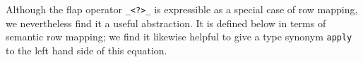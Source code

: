 \documentclass[authoryear, acmsmall, screen, review, nonacm]{acmart}
\begin{document}
Although the flap operator \verb!_<?>_! is expressible as a special case of row mapping, we nevertheless find it a useful abstraction. It is defined below in terms of semantic row mapping; we find it likewise helpful to give a type synonym \verb!apply! to the left hand side of this equation.

\begin{code}%
\>[0]\AgdaSpace{}%
\AgdaSymbol{:}\AgdaSpace{}%
\AgdaSpace{}%
\AgdaSpace{}%
\AgdaSpace{}%
\AgdaSpace{}%
\AgdaSpace{}%
\AgdaSpace{}%
\AgdaSymbol{((}\AgdaSpace{}%
\AgdaSpace{}%
\AgdaSymbol{)}\AgdaSpace{}%
\AgdaSpace{}%
\AgdaSymbol{)}\<%
\\
\>[0]\AgdaSpace{}%
\AgdaSpace{}%
\AgdaSymbol{=}\AgdaSpace{}%
\AgdaSpace{}%
\AgdaSpace{}%
\AgdaSpace{}%
\AgdaSpace{}%
\AgdaSpace{}%
\AgdaSpace{}%
\AgdaSymbol{(}\AgdaSpace{}%
\AgdaSpace{}%
\AgdaSymbol{)}\<%
\\
%
\\[\AgdaEmptyExtraSkip]%
\>[0]\AgdaSpace{}%
\AgdaSpace{}%
\<%
\\
\>[0]\AgdaSpace{}%
\AgdaSymbol{:}\AgdaSpace{}%
\AgdaSpace{}%
\AgdaSpace{}%
\AgdaOperator{\AgdaInductiveConstructor{R[}}\AgdaSpace{}%
\AgdaSpace{}%
\AgdaSpace{}%
\AgdaSpace{}%
\AgdaOperator{\AgdaInductiveConstructor{]}}\AgdaSpace{}%
\AgdaSpace{}%
\AgdaSpace{}%
\AgdaSpace{}%
\AgdaSpace{}%
\AgdaSpace{}%
\AgdaSpace{}%
\AgdaSpace{}%
\AgdaOperator{\AgdaInductiveConstructor{R[}}\AgdaSpace{}%
\AgdaSpace{}%
\AgdaOperator{\AgdaInductiveConstructor{]}}\<%
\\
\>[0]\AgdaSpace{}%
\AgdaSpace{}%
\AgdaSpace{}%
\AgdaSymbol{=}\AgdaSpace{}%
\AgdaSpace{}%
\AgdaSpace{}%
\AgdaSpace{}%
\<%
\end{code}
\end{document}
